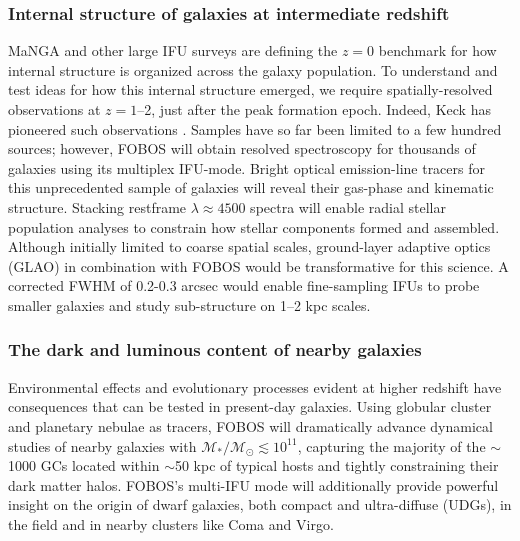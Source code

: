 \subsubsection{Internal structure of galaxies at intermediate redshift}

MaNGA \citep{bundy15} and other large IFU surveys are defining the
$z=0$ benchmark for how internal structure is organized across the
galaxy population. To understand and test ideas for how this internal
structure emerged, we require spatially-resolved observations at $z =
1$--2, just after the peak formation epoch. Indeed, Keck has
pioneered such observations \citep[e.g.,][]{erb04, miller11,law09}.
Samples have so far been limited to a few hundred sources; however,
FOBOS will obtain resolved spectroscopy for thousands of galaxies
using its multiplex IFU-mode. Bright optical emission-line tracers
for this unprecedented sample of galaxies will reveal their gas-phase
and kinematic structure. Stacking restframe $\lambda \approx 4500$
spectra will enable radial stellar population analyses to constrain
how stellar components formed and assembled. Although initially
limited to coarse spatial scales, ground-layer adaptive optics (GLAO)
in combination with FOBOS would be transformative for this science. A
corrected FWHM of 0.2-0.3 arcsec would enable fine-sampling IFUs to
probe smaller galaxies and study sub-structure on 1--2 kpc scales.


\subsubsection{The dark and luminous content of nearby galaxies}

Environmental effects and evolutionary processes evident at higher redshift have consequences that can be tested in present-day galaxies.  Using globular cluster and planetary nebulae as tracers, FOBOS will
dramatically advance dynamical studies of nearby galaxies with
$\mathcal{M_\ast/M_\odot} \lesssim 10^{11}$, capturing the majority
of the $\sim$1000 GCs located within $\sim$50 kpc of typical hosts
\citep[see][]{2013ApJ...772...82H} and tightly constraining their
dark matter halos. FOBOS's multi-IFU mode will additionally provide
powerful insight on the origin of dwarf galaxies, both compact and
ultra-diffuse (UDGs), in the field and in nearby clusters like Coma
and Virgo.


